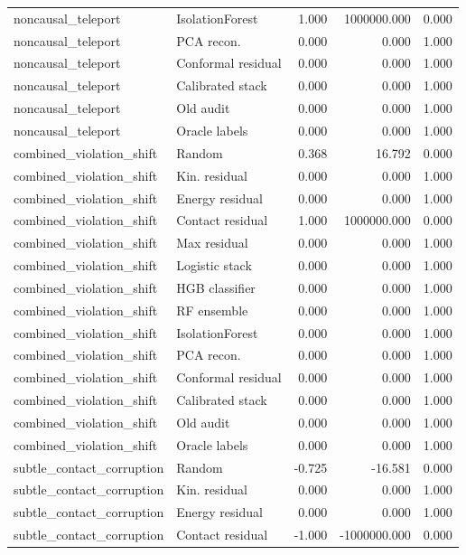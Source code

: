 {\begin{longtable}{llrrr}
noncausal\_teleport & IsolationForest & 1.000 & 1000000.000 & 0.000 \\
noncausal\_teleport & PCA recon. & 0.000 & 0.000 & 1.000 \\
noncausal\_teleport & Conformal residual & 0.000 & 0.000 & 1.000 \\
noncausal\_teleport & Calibrated stack & 0.000 & 0.000 & 1.000 \\
noncausal\_teleport & Old audit & 0.000 & 0.000 & 1.000 \\
noncausal\_teleport & Oracle labels & 0.000 & 0.000 & 1.000 \\
combined\_violation\_shift & Random & 0.368 & 16.792 & 0.000 \\
combined\_violation\_shift & Kin. residual & 0.000 & 0.000 & 1.000 \\
combined\_violation\_shift & Energy residual & 0.000 & 0.000 & 1.000 \\
combined\_violation\_shift & Contact residual & 1.000 & 1000000.000 & 0.000 \\
combined\_violation\_shift & Max residual & 0.000 & 0.000 & 1.000 \\
combined\_violation\_shift & Logistic stack & 0.000 & 0.000 & 1.000 \\
combined\_violation\_shift & HGB classifier & 0.000 & 0.000 & 1.000 \\
combined\_violation\_shift & RF ensemble & 0.000 & 0.000 & 1.000 \\
combined\_violation\_shift & IsolationForest & 0.000 & 0.000 & 1.000 \\
combined\_violation\_shift & PCA recon. & 0.000 & 0.000 & 1.000 \\
combined\_violation\_shift & Conformal residual & 0.000 & 0.000 & 1.000 \\
combined\_violation\_shift & Calibrated stack & 0.000 & 0.000 & 1.000 \\
combined\_violation\_shift & Old audit & 0.000 & 0.000 & 1.000 \\
combined\_violation\_shift & Oracle labels & 0.000 & 0.000 & 1.000 \\
subtle\_contact\_corruption & Random & -0.725 & -16.581 & 0.000 \\
subtle\_contact\_corruption & Kin. residual & 0.000 & 0.000 & 1.000 \\
subtle\_contact\_corruption & Energy residual & 0.000 & 0.000 & 1.000 \\
subtle\_contact\_corruption & Contact residual & -1.000 & -1000000.000 & 0.000 \\

\end{longtable}}
